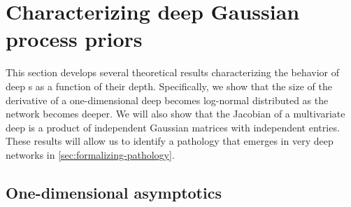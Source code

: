 \section{Characterizing deep Gaussian process priors}
\label{sec:characterizing-deep-gps}

This section develops several theoretical results characterizing the behavior of deep \gp{}s as a function of their depth.
Specifically, we show that the size of the derivative of a one-dimensional deep \gp{} becomes log-normal distributed as the network becomes deeper.
We will also show that the Jacobian of a multivariate deep \gp{} is a product of independent Gaussian matrices with independent entries.
These results will allow us to identify a pathology that emerges in very deep networks in \cref{sec:formalizing-pathology}.


\subsection{One-dimensional asymptotics}
\label{sec:1d}


